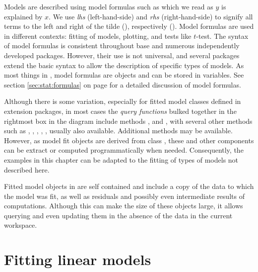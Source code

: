 \documentclass[krantz2]{krantz}\usepackage{knitr}
\begin{document}
Models are described using model formulas such as  which we read as $y$ is explained by $x$. We use \emph{lhs} (left-hand-side) and \emph{rhs} (right-hand-side) to signify all terms to the left and right of the tilde (), respectively (). Model formulas are used in different contexts: fitting of models, plotting, and tests like $t$-test. The syntax of model formulas is consistent throughout base \Rlang and numerous independently developed packages. However, their use is not universal, and several packages extend the basic syntax to allow the description of specific types of models. As most things in \Rlang, model formulas are objects and can be stored in variables. See section \ref{sec:stat:formulas} on page \pageref{sec:stat:formulas} for a detailed discussion of model formulas.

Although there is some variation, especially for fitted model classes defined in extension packages, in most cases the \textsl{query functions} bulked together in the rightmost box in the diagram include methods ,  and , with several other methods such as , , , , ,  usually also available. Additional methods may be available. However, as model fit objects are derived from class , these and other components can be extract or computed programmatically when needed. Consequently, the examples in this chapter can be adapted to the fitting of types of models not described here.

\begin{explainbox}
  Fitted model objects in \Rlang are self contained and include a copy of the data to which the model was fit, as well as residuals and possibly even intermediate results of computations. Although this can make the size of these objects large, it allows querying and even updating them in the absence of the data in the current \Rlang workspace.
\end{explainbox}


\section{Fitting linear models}\label{sec:stat:LM}
\end{document}
